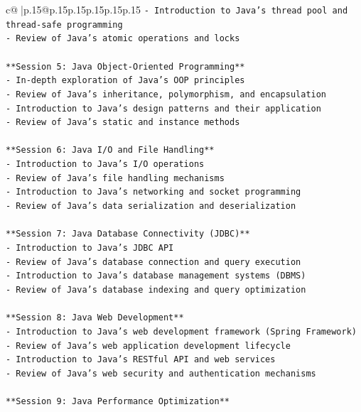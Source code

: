 \documentclass{article}
\begin{document}
{\begin{supertabular}{c@{$\;$}|p{.15\linewidth}@{}p{.15\linewidth}p{.15\linewidth}p{.15\linewidth}p{.15\linewidth}p{.15\linewidth}}
{{{\texttt{{-} Introduction to Java's thread pool and thread{-}safe programming} \\
\texttt{{-} Review of Java's atomic operations and locks} \\
\\ 
\texttt{**Session 5: Java Object{-}Oriented Programming**} \\
\texttt{{-} In{-}depth exploration of Java's OOP principles} \\
\texttt{{-} Review of Java's inheritance, polymorphism, and encapsulation} \\
\texttt{{-} Introduction to Java's design patterns and their application} \\
\texttt{{-} Review of Java's static and instance methods} \\
\\ 
\texttt{**Session 6: Java I/O and File Handling**} \\
\texttt{{-} Introduction to Java's I/O operations} \\
\texttt{{-} Review of Java's file handling mechanisms} \\
\texttt{{-} Introduction to Java's networking and socket programming} \\
\texttt{{-} Review of Java's data serialization and deserialization} \\
\\ 
\texttt{**Session 7: Java Database Connectivity (JDBC)**} \\
\texttt{{-} Introduction to Java's JDBC API} \\
\texttt{{-} Review of Java's database connection and query execution} \\
\texttt{{-} Introduction to Java's database management systems (DBMS)} \\
\texttt{{-} Review of Java's database indexing and query optimization} \\
\\ 
\texttt{**Session 8: Java Web Development**} \\
\texttt{{-} Introduction to Java's web development framework (Spring Framework)} \\
\texttt{{-} Review of Java's web application development lifecycle} \\
\texttt{{-} Introduction to Java's RESTful API and web services} \\
\texttt{{-} Review of Java's web security and authentication mechanisms} \\
\\ 
\texttt{**Session 9: Java Performance Optimization**} \\
}}}
\end{supertabular}}
\end{document}
